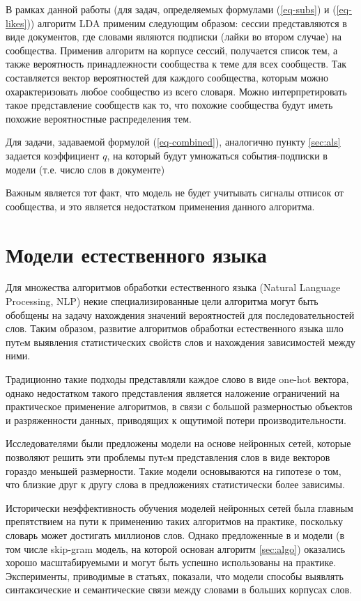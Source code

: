 \documentclass[times,specification,annotation]{itmo-student-thesis}
\begin{document}
В рамках данной работы (для задач, определяемых формулами (\ref{eq-subs}) и (\ref{eq-likes})) алгоритм LDA применим следующим образом: сессии представляются в виде документов, где словами являются подписки (лайки во втором случае) на сообщества. Применив алгоритм на корпусе сессий, получается список тем, а также вероятность принадлежности сообщества к теме для всех сообществ. Так составляется вектор вероятностей для каждого сообщества, которым можно охарактеризовать любое сообщество из всего словаря. Можно интерпретировать такое представление сообществ как то, что похожие сообщества будут иметь похожие вероятностные распределения тем. 

Для задачи, задаваемой формулой (\ref{eq-combined}), аналогично пункту \ref{sec:als} задается коэффициент $q$, на который будут умножаться события-подписки в модели (т.е. число слов в документе) 
 
Важным является тот факт, что модель не будет учитывать сигналы отписок от сообщества, и это является недостатком применения данного алгоритма. 

\section{Модели естественного языка}\label{sec:nlp-intro}

Для множества алгоритмов обработки естественного языка (Natural Language Processing, NLP) некие специализированные цели алгоритма могут быть обобщены на задачу нахождения значений вероятностей для последовательностей слов.
Таким образом, развитие алгоритмов обработки естественного языка шло путeм выявления статистических свойств слов и нахождения зависимостей между ними.

Традиционно такие подходы представляли каждое слово в виде one-hot вектора, однако недостатком такого представления является наложение ограничений на практическое применение алгоритмов, в связи с большой размерностью объектов и разряженности данных, приводящих к ощутимой потери производительности.

Исследователями были предложены модели на основе нейронных сетей\cite{turian2010}, которые позволяют решить эти проблемы путeм представления слов в виде векторов гораздо меньшей размерности. Такие модели основываются на гипотезе о том, что близкие друг к другу слова в предложениях статистически более зависимы.

Исторически неэффективность обучения моделей нейронных сетей была главным препятствием на пути к применению таких алгоритмов на практике, поскольку словарь может достигать миллионов слов. Однако предложенные в \cite{mikolov2013efficient} и \cite{mikolov2013distributed} модели (в том числе skip-gram модель, на которой основан алгоритм \ref{sec:algo}) оказались хорошо масштабируемыми и могут быть успешно использованы на практике. Эксперименты, приводимые в статьях, показали, что модели способы выявлять синтаксические и семантические связи между словами в больших корпусах слов. 
\end{document}
